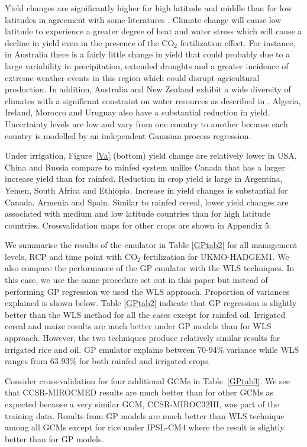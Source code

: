 Yield changes are significantly higher for high latitude and middle than for low latitudes in agreement with some literatures \citet{n11,42b,n12}. %
Climate change will cause low latitude to experience a greater degree of heat and water stress which will cause a decline in yield even in the presence of the CO$_2$ fertilization effect. For instance, in Australia there is a fairly little change in yield that could probably due to a large variability in precipitation, extended droughts and a greater incidence of extreme weather events in this region which could disrupt agricultural production. In addition, Australia and New Zealand exhibit a wide diversity of climates with a significant constraint on water resources as described in \citep{q85}. Algeria, Ireland, Morocco and Uruguay also have a substantial reduction in yield. Uncertainty levels are low and vary from one country to another because each country is modelled by an independent Gaussian process regression.


Under irrigation, Figure~\ref{Va} (bottom) yield change are relatively lower in USA, China and Russia compare to rainfed system unlike Canada that has a larger increase yield than for rainfed. Reduction in crop yield is large in Argentina, Yemen, South Africa and Ethiopia. Increase in yield changes is substantial for Canada, Armenia and Spain. Similar to rainfed cereal, lower yield changes are associated with medium and low latitude countries than for high latitude countries. 
Crossvalidation maps for other crops are shown in Appendix 5.

We summarise the results of the emulator in Table \ref{GPtab2} for all management levels, RCP and time point with CO$_2$ fertilization for UKMO-HADGEM1. We also compare the performance of the GP emulator with the WLS techniques. In this case, we use the same procedure set out in this paper but instead of performing GP regression we used the WLS approach. Proportion of variances explained is shown below.
Table \ref{GPtab2} indicate that GP regression is slightly better than the WLS method for all the cases except for rainfed oil. Irrigated cereal and maize results are much better under GP models than for WLS approach. However, the two techniques produce relatively similar results for irrigated rice and oil. GP emulator explains between 70-94\% variance while WLS ranges from 63-93\% for both rainfed and irrigated crops. 

Consider cross-validation for four additional GCMs in Table~\ref{GPtab3}. We see that CCSR-MIROCMED results are much better than for other GCMs as expected because a very similar GCM, CCSR-MIROC32HI, was part of the training data. Results from GP models are much better than WLS technique among all GCMs except for rice under IPSL-CM4 where the result is slightly better than for GP models.

